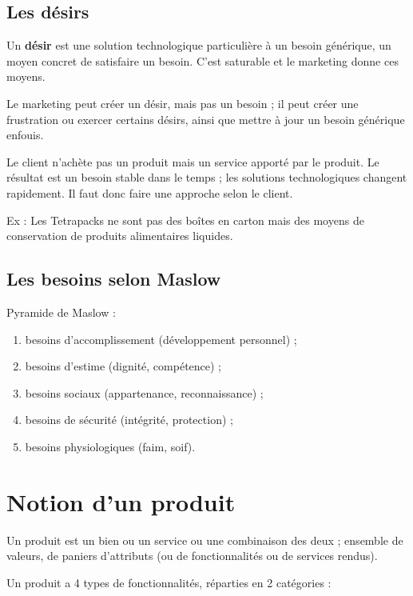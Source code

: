 		\subsection{Les désirs}
		
		Un \textbf{désir} est une solution technologique particulière à un besoin générique, un moyen concret de satisfaire un besoin. C'est saturable et le marketing donne ces moyens.

		Le marketing peut créer un désir, mais pas un besoin ; il peut créer une frustration ou exercer certains désirs, ainsi que mettre à jour un besoin générique enfouis. 

		Le client n'achète pas un produit mais un service apporté par le produit. Le résultat est un besoin stable dans le temps ; les solutions technologiques changent rapidement. Il faut donc faire une approche selon le client.

		Ex : Les Tetrapacks ne sont pas des boîtes en carton mais des moyens de conservation de produits alimentaires liquides.

		\subsection{Les besoins selon Maslow}

		Pyramide de Maslow :

		\begin{enumerate}
			\item besoins d'accomplissement (développement personnel) ;
			\item besoins d'estime (dignité, compétence) ;
			\item besoins sociaux (appartenance, reconnaissance) ;
			\item besoins de sécurité (intégrité, protection) ;
			\item besoins physiologiques (faim, soif).
		\end{enumerate}


		
	\section{Notion d'un produit}

	Un produit est un bien ou un service ou une combinaison des deux ; ensemble de valeurs, de paniers d'attributs (ou de fonctionnalités ou de services rendus).


	Un produit a 4 types de fonctionnalités, réparties en 2 catégories :

